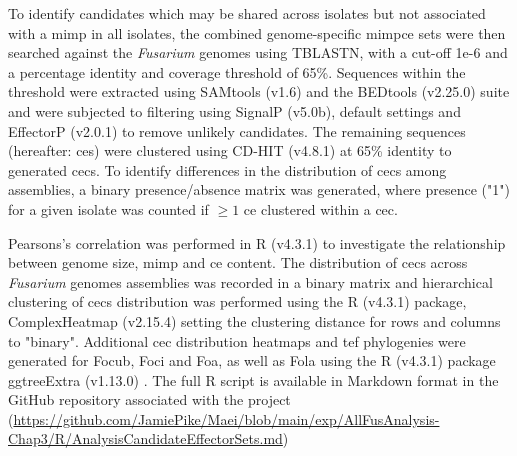 To identify candidates which may be shared across isolates but not associated with a \ac{mimp} in all isolates, the combined genome-specific \ac{mimpce} sets were then searched against the \textit{Fusarium} genomes using TBLASTN, with a cut-off 1e-6 and a percentage identity and coverage threshold of 65\%. Sequences within the threshold were extracted using  SAMtools (v1.6) and the BEDtools (v2.25.0) suite and were subjected to filtering using SignalP (v5.0b), default settings and EffectorP (v2.0.1) to remove unlikely candidates. The remaining sequences (hereafter: \acf{ce}s) were clustered using CD-HIT (v4.8.1) \parencite{Fu2012} at 65\% identity to generated \acp{cec}. To identify differences in the distribution of \acp{cec} among assemblies, a binary presence/absence matrix was generated, where presence ("1") for a given isolate was counted if $\geq1 $ \ac{ce} clustered within a \ac{cec}.

Pearsons’s correlation was performed in R (v4.3.1) \parencite{R} to investigate the relationship  between genome size, \ac{mimp} and \ac{ce} content. The distribution of \acp{cec} across \textit{Fusarium} genomes assemblies was recorded in a binary matrix and hierarchical clustering of \acp{cec} distribution was performed using the R (v4.3.1) \parencite{R} package, ComplexHeatmap (v2.15.4)  \parencite{ComplexHeatmap} setting the clustering distance for rows and columns to "binary". Additional \ac{cec} distribution heatmaps and \ac{tef} phylogenies were generated for \ac{Focub}, \ac{Foci} and \ac{Foa}, as well as \ac{Fola} using the R (v4.3.1) package ggtreeExtra (v1.13.0) \parencite{ggtree}. The full R script is available in Markdown format in the GitHub repository associated with the project (\href{https://github.com/JamiePike/Maei/blob/main/exp/AllFusAnalysis-Chap3/R/AnalysisCandidateEffectorSets.md}{https://github.com/JamiePike/Maei/blob/main/exp/AllFusAnalysis-Chap3/R/Ana\-lysisCandidateEffectorSets.md}) 

